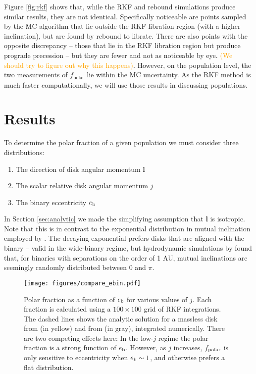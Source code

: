 \documentclass[twocolumn]{aastex631}
\newcommand{\TJ}[1]{\textcolor{orange}{#1}}
\begin{document}
Figure \ref{fig:rkf} shows that, while the RKF and {\sc rebound} simulations produce similar results, they are not identical. Specifically noticeable are points sampled by the MC algorithm that lie outside the RKF libration region (with a higher inclination), but are found by {\sc rebound} to librate. There are also points with the opposite discrepancy -- those that lie in the RKF libration region but produce prograde precession -- but they are fewer and not as noticeable by eye. \TJ{(We should try to figure out why this happens)}. However, on the population level, the two measurements of $f_\text{polar}$ lie within the MC uncertainty. As the RKF method is much faster computationally, we will use those results in discussing populations.

\section{Results}
\label{sec:results}

To determine the polar fraction of a given population we must consider three distributions:
\begin{enumerate}
    \item The direction of disk angular momentum $\bm{l}$ \label{it:l} \\
    \item The scalar relative disk angular momentum $j$ \label{it:j} \\
    \item The binary eccentricity $e_{\rm b}$ \label{it:eb}
\end{enumerate}

In Section \ref{sec:analytic} we made the simplifying assumption that $\bm{l}$ is isotropic. Note that this is in contrast to the exponential distribution in
mutual inclination employed by \citet{ceppi2024}. The decaying exponential prefers disks that are aligned with the binary -- valid in the wide-binary regime, but
hydrodynamic simulations by \citet{elsender2023} found that, for binaries with separations on the order of 1 AU, mutual inclinations are seemingly randomly
distributed between $0$ and $\pi$. %

\begin{figure*}[!htbp]
    \begin{centering}
        \texttt{[image: figures/compare\_ebin.pdf]}
        \caption{
            Polar fraction as a function of $e_{\rm b}$ for various values of $j$. Each fraction is calculated using a $100\times 100$ grid of RKF integrations.
            The dashed lines shows the analytic solution for a massless disk from \citet{zanazzi2018} (in yellow) and from \citet{martin2019} (in gray), integrated numerically.
            There are two competing effects here:
            In the low-$j$ regime the polar fraction is a strong function of $e_{\rm b}$. However, as $j$ increases, $f_{\rm polar}$ is only sensitive to eccentricity
            when $e_{\rm b} \sim 1$, and otherwise prefers a flat distribution.
        }
        \label{fig:ebin}
    \end{centering}
\end{figure*}
\end{document}
